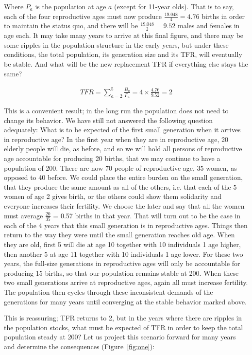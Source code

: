 \documentclass[reqno,12pt,oneside,a4paper]{report} %
\theoremstyle{plain}
\theoremstyle{definition}
\theoremstyle{remark}
\numberwithin{theorem}{chapter}     %
\begin{document}
Where $P_a$ is the population at age $a$ (except for 11-year olds). That is to say, each of the four reproductive ages must now produce $\frac{19.048}{4}= 4.76$ births in order to maintain the status quo, and there will be $\frac{19.048}{2}= 9.52$ males and females in age each. It may take many years to arrive at this final figure, and there may be some ripples in the population structure in the early years, but under these conditions, the total population, its generation size and its TFR, will eventually be stable. And what will be the new replacement TFR if everything else stays the same?

\begin{align}
TFR = \sum_{a=2}^{5} \frac{B_a}{F_a} = 4 \times\frac{4.76}{9.52} = 2 
\end{align}

This is a convenient result; in the long run the population does not need to change its behavior. We have still not answered the following question adequately: What is to be expected of the first small generation when it arrives in reproductive age? In the first year when they are in reproductive age, 20 elderly people will die, as before, and so we will hold all persons of reproductive age accountable for producing 20 births, that we may continue to have a population of 200. There are now 70 people of reproductive age, 35 women, as opposed to 40 before. We could place the entire burden on the small generation, that they produce the same amount as all of the others, i.e. that each of the 5 women of age 2 gives birth, or the others could show them solidarity and everyone increases their fertility. We choose the later and say that all the women must average $\frac{20}{35}$ = 0.57 births in that year. That will turn out to be the case in each of the 4 years that this small generation is in reproductive ages. Things then return to the way they were until the small generation reaches old age. When they are old, first 5 will die at age 10 together with 10 individuals 1 age higher, then another 5 at age 11 together with 10 individuals 1 age lower. For these two years, the full-size generations in reproductive ages will only be accountable for producing 15 births, so that our population remains stable at 200. When these two small generations arrive at reproductive ages, again all must increase fertility. The population then cycles through these inconsistent demands of the generations for many years until converging at the stable behavior marked above.

This is reassuring; TFR returns to 2, but in the years where there are ripples in the population stocks, what must be expected of TFR in order to keep the total population steady at 200? Let us project this scenario forward for many years and determine the consequences (Figure~\ref{fig:one}):
\end{document}
